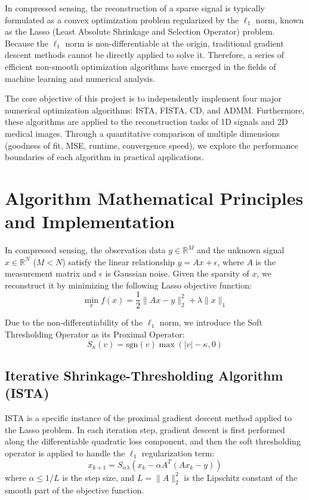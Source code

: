 \documentclass[12pt, a4paper]{article}
\begin{document}
In compressed sensing, the reconstruction of a sparse signal is typically formulated as a convex optimization problem regularized by the $\ell_1$ norm, known as the Lasso (Least Absolute Shrinkage and Selection Operator) problem. Because the $\ell_1$ norm is non-differentiable at the origin, traditional gradient descent methods cannot be directly applied to solve it. Therefore, a series of efficient non-smooth optimization algorithms have emerged in the fields of machine learning and numerical analysis.

The core objective of this project is to independently implement four major numerical optimization algorithms: ISTA, FISTA, CD, and ADMM. Furthermore, these algorithms are applied to the reconstruction tasks of 1D signals and 2D medical images. Through a quantitative comparison of multiple dimensions (goodness of fit, MSE, runtime, convergence speed), we explore the performance boundaries of each algorithm in practical applications.

\section{Algorithm Mathematical Principles and Implementation}

In compressed sensing, the observation data $y \in \mathbb{R}^M$ and the unknown signal $x \in \mathbb{R}^N$ ($M < N$) satisfy the linear relationship $y = Ax + \epsilon$, where $A$ is the measurement matrix and $\epsilon$ is Gaussian noise. Given the sparsity of $x$, we reconstruct it by minimizing the following Lasso objective function:
\begin{equation}
    \min_{x} f(x) = \frac{1}{2} \|Ax - y\|_2^2 + \lambda \|x\|_1
\end{equation}

Due to the non-differentiability of the $\ell_1$ norm, we introduce the Soft Thresholding Operator as its Proximal Operator:
\begin{equation}
    S_{\kappa}(v) = \text{sgn}(v) \max(|v| - \kappa, 0)
\end{equation}

\subsection{Iterative Shrinkage-Thresholding Algorithm (ISTA)}
ISTA is a specific instance of the proximal gradient descent method applied to the Lasso problem. In each iteration step, gradient descent is first performed along the differentiable quadratic loss component, and then the soft thresholding operator is applied to handle the $\ell_1$ regularization term:
\begin{equation}
    x_{k+1} = S_{\alpha\lambda}\left( x_k - \alpha A^T(Ax_k - y) \right)
\end{equation}
where $\alpha \le 1/L$ is the step size, and $L = \|A\|_2^2$ is the Lipschitz constant of the smooth part of the objective function.
\end{document}

